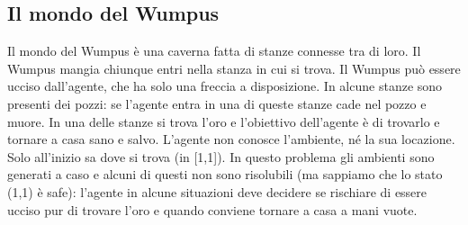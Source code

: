 \documentclass{article}
\begin{document}
\subsection{Il mondo del Wumpus}
Il mondo del Wumpus è una caverna fatta di stanze connesse tra di loro. Il Wumpus mangia chiunque entri nella stanza in cui si trova. Il Wumpus può essere ucciso dall’agente, che ha solo una freccia a disposizione. In alcune stanze sono presenti dei pozzi: se l'agente entra in una di queste stanze cade nel pozzo e muore. In una delle stanze si trova l’oro e l’obiettivo dell'agente è di trovarlo e tornare a casa sano e salvo. L’agente non conosce l’ambiente, né la sua locazione. Solo all'inizio sa dove si trova (in [1,1]). In questo problema gli ambienti sono generati a caso e alcuni di questi non sono risolubili (ma sappiamo che lo stato (1,1) è safe): l’agente in alcune situazioni deve decidere se rischiare di essere ucciso pur di trovare l’oro e quando conviene tornare a casa a mani vuote.
\end{document}
